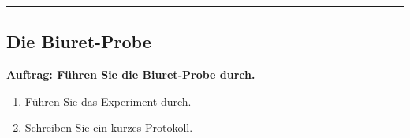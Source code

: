 \documentclass{scrartcl}  %
\begin{document}
%			
		\begin{center}
			\noindent\rule{18cm}{0.1pt}
		\end{center}
\newpage
		\subsection{Die Biuret-Probe}
		
		\textbf{Auftrag: Führen Sie die Biuret-Probe durch.}	
		\begin{enumerate}
			\item Führen Sie das Experiment durch.
			\item Schreiben Sie ein kurzes Protokoll.
		\end{enumerate}
\end{document}
